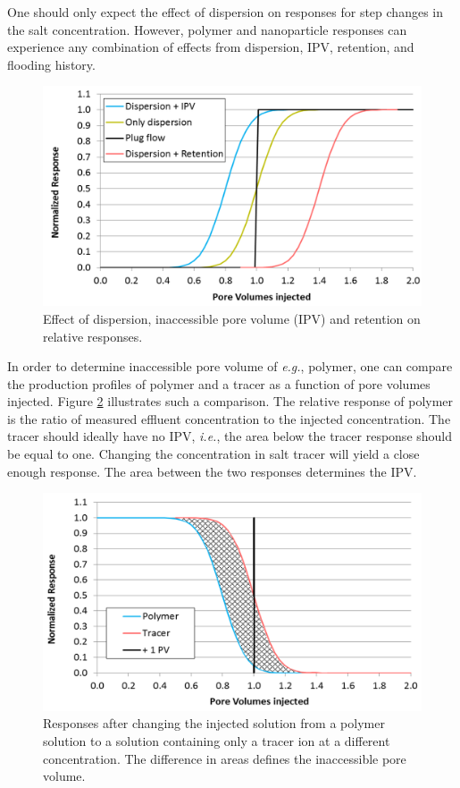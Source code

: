 One should only expect the effect of dispersion on responses for step changes in the salt concentration. However, polymer and nanoparticle responses can experience any combination of effects from dispersion, IPV, retention, and flooding history.

\begin{figure}[h!]
    \centering
    \includegraphics[width=\textwidth]{img/fig/ipvRet1.png}
    \caption{Effect of dispersion, inaccessible pore volume (IPV) and retention on relative responses.}
    \label{fig:ipvRet1} %
\end{figure}

In order to determine inaccessible pore volume  of \textit{e.g.}, polymer, one can compare the production profiles of polymer and a tracer as a function of pore volumes injected. Figure \ref{fig:ipvRet2} illustrates such a comparison. The relative response of polymer is the ratio of measured effluent concentration to the injected concentration. The tracer should ideally have no IPV, \textit{i.e.}, the area below the tracer response should be equal to one. Changing the concentration in salt tracer will yield a close enough response. The area between the two responses determines the IPV.

\begin{figure}[h!]
    \centering
    \includegraphics[width=\textwidth]{img/fig/ipvRet2.png}
    \caption{Responses after changing the injected solution from a polymer solution to a solution containing only a tracer ion at a different concentration. The difference in areas defines the inaccessible pore volume.}
    \label{fig:ipvRet2} %
\end{figure}

